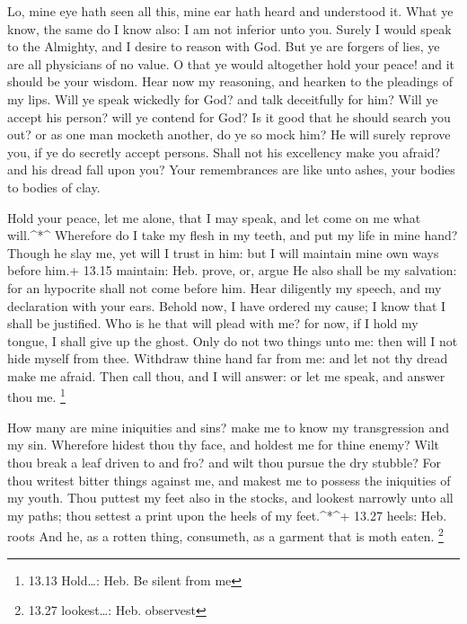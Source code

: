  Lo, mine eye hath seen all this, mine ear hath heard and
understood it.  What ye know, the same do I know also: I am
not inferior unto you.  Surely I would speak to the
Almighty, and I desire to reason with God.  But ye are
forgers of lies, ye are all physicians of no value.  O that
ye would altogether hold your peace! and it should be your wisdom.
 Hear now my reasoning, and hearken to the pleadings of my
lips.  Will ye speak wickedly for God? and talk deceitfully
for him?  Will ye accept his person? will ye contend for
God?  Is it good that he should search you out? or as one
man mocketh another, do ye so mock him?  He will surely
reprove you, if ye do secretly accept persons.  Shall not
his excellency make you afraid? and his dread fall upon you?
 Your remembrances are like unto ashes, your bodies to
bodies of clay.

 Hold your peace, let me alone, that I may speak, and let
come on me what will.\^{}*\^{}  Wherefore do I take my
flesh in my teeth, and put my life in mine hand?  Though he
slay me, yet will I trust in him: but I will maintain mine own ways
before him.+ 13.15 maintain: Heb. prove, or, argue  He also
shall be my salvation: for an hypocrite shall not come before him.
 Hear diligently my speech, and my declaration with your
ears.  Behold now, I have ordered my cause; I know that I
shall be justified.  Who is he that will plead with me? for
now, if I hold my tongue, I shall give up the ghost.  Only
do not two things unto me: then will I not hide myself from thee.
 Withdraw thine hand far from me: and let not thy dread
make me afraid.  Then call thou, and I will answer: or let
me speak, and answer thou me. \footnote{13.13 Hold\ldots: Heb. Be silent
  from me}

 How many are mine iniquities and sins? make me to know my
transgression and my sin.  Wherefore hidest thou thy face,
and holdest me for thine enemy?  Wilt thou break a leaf
driven to and fro? and wilt thou pursue the dry stubble? 
For thou writest bitter things against me, and makest me to possess the
iniquities of my youth.  Thou puttest my feet also in the
stocks, and lookest narrowly unto all my paths; thou settest a print
upon the heels of my feet.\^{}*\^{}+ 13.27 heels: Heb. roots
 And he, as a rotten thing, consumeth, as a garment that is
moth eaten. \footnote{13.27 lookest\ldots: Heb. observest}

